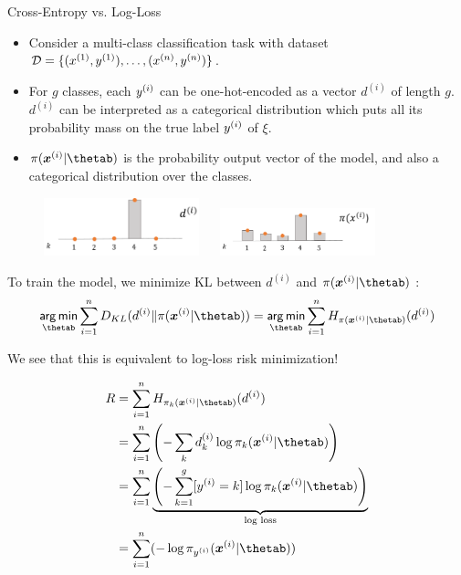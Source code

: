 \begin{vbframe}{Cross-Entropy vs. Log-Loss}

  \begin{itemize}
    \item Consider a multi-class classification task with dataset $\mathcal{D} = \{ (x^{(1)}, y^{(1)}), \ldots, (x^{(n)}, y^{(n)})\}$.
    \item For $g$ classes, each $y^{(i)}$ can be one-hot-encoded as a vector $d^{(i)}$ of length $g$. $d^{(i)}$ can be interpreted as a categorical distribution which puts all its probability mass on the true label $y^{(i)}$ of $\xi$.
    \item $\pi(\xv^{(i)}|\thetab)$ is the probability output vector of the model, and also a categorical distribution over the classes.

  \end{itemize}
\lz
\begin{figure}
\includegraphics[width=0.4\textwidth]{figure_man/multinoulli.png}
~~
\includegraphics[width=0.4\textwidth]{figure_man/multiclass-predictive.png}
\end{figure}
    \framebreak

    
To train the model, we minimize KL between $d^{(i)}$ and $\pi(\xv^{(i)}|\thetab)$ :
$$ \argmin_{\thetab} \sum_{i=1}^n D_{KL} (d^{(i)} \| \pi(\xv^{(i)}|\thetab)) = \argmin_{\thetab} \sum_{i=1}^n  H_{\pi(\xv^{(i)}|\thetab)}(d^{(i)}) $$
  
We see that this is equivalent to log-loss risk minimization!
  \begin{footnotesize}
    \begin{equation*}
      \begin{split}
               R &= \sumin  H_{\pi_k(\xv^{(i)}|\thetab)}(d^{(i)}) \\
                 &= \sumin \left( - \sum_k d^{(i)}_k \log\pi_k(\xv^{(i)}|\thetab) \right) \\
                 & = \sumin \underbrace{ \left( -\sum_{k = 1}^g [\yi = k]\log \pi_{k}(\xv^{(i)}|\thetab) \right) }_{\text{log loss}} \\
                 & = \sumin (-\log\pi_{y^{(i)}}(\xv^{(i)}|\thetab)) 
      \end{split}
    \end{equation*}
  \end{footnotesize}
\end{vbframe}

